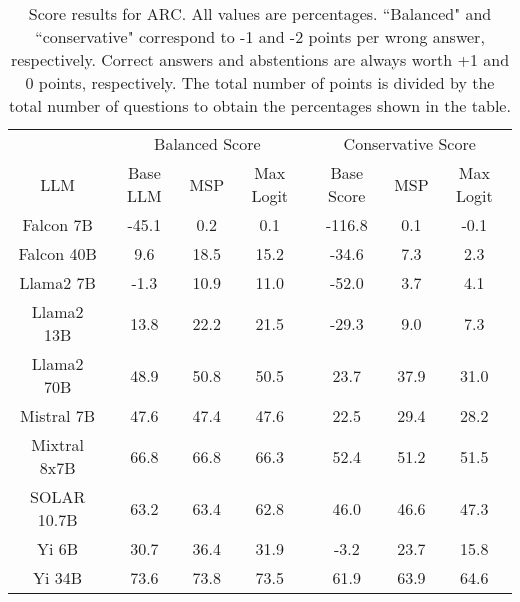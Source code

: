 \renewcommand\arraystretch{1.2}
\begin{table*}
\centering
\begin{tabular}{c|c|c|c|c|c|c}
& \multicolumn{3}{c|}{Balanced Score} & \multicolumn{3}{c}{Conservative Score} \\ 
LLM & Base LLM & MSP & Max Logit & Base Score & MSP & Max Logit\\ \hline
Falcon 7B & -45.1 & 0.2 & 0.1 & -116.8 & 0.1 & -0.1\\
Falcon 40B & 9.6 & 18.5 & 15.2 & -34.6 & 7.3 & 2.3\\
Llama2 7B & -1.3 & 10.9 & 11.0 & -52.0 & 3.7 & 4.1\\
Llama2 13B & 13.8 & 22.2 & 21.5 & -29.3 & 9.0 & 7.3\\
Llama2 70B & 48.9 & 50.8 & 50.5 & 23.7 & 37.9 & 31.0\\
Mistral 7B & 47.6 & 47.4 & 47.6 & 22.5 & 29.4 & 28.2\\
Mixtral 8x7B & 66.8 & 66.8 & 66.3 & 52.4 & 51.2 & 51.5\\
SOLAR 10.7B & 63.2 & 63.4 & 62.8 & 46.0 & 46.6 & 47.3\\
Yi 6B & 30.7 & 36.4 & 31.9 & -3.2 & 23.7 & 15.8\\
Yi 34B & 73.6 & 73.8 & 73.5 & 61.9 & 63.9 & 64.6\\
\hline
\end{tabular}
\caption{Score results for ARC. All values are percentages. ``Balanced" and ``conservative" correspond to -1 and -2 points per wrong answer, respectively. Correct answers and abstentions are always worth +1 and 0 points, respectively. The total number of points is divided by the total number of questions to obtain the percentages shown in the table.}
\label{tab:arc_score}
\end{table*}
